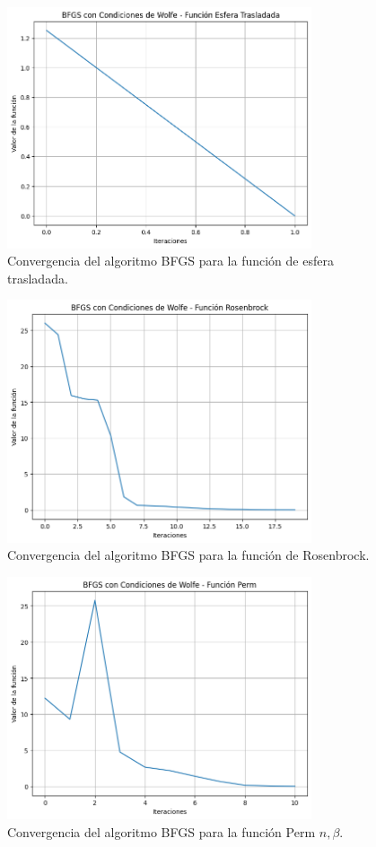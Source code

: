 \documentclass{article}
\begin{document}
\begin{figure}[H]
    \centering
    \includegraphics[width=0.8\textwidth]{images/5_sphere.png}
    \caption{Convergencia del algoritmo BFGS para la función de esfera trasladada.}
\end{figure}

\begin{figure}[H]
    \centering
    \includegraphics[width=0.8\textwidth]{images/5_rosenbrock.png}
    \caption{Convergencia del algoritmo BFGS para la función de Rosenbrock.}
\end{figure}

\begin{figure}[H]
    \centering
    \includegraphics[width=0.8\textwidth]{images/5_perm.png}
    \caption{Convergencia del algoritmo BFGS para la función Perm $n,\beta$.}
\end{figure}
\end{document}
